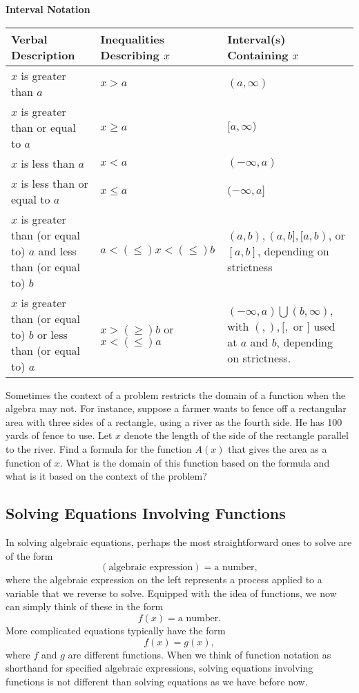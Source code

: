 \begin{tcolorbox}
{\bf Interval Notation}\\
\begin{tabular}{p{2in} | p{1.2in} | p{1in}}
Verbal Description & Inequalities Describing $x$ & Interval(s) Containing $x$\\
\hline\hline $x$ is greater than $a$ & $x>a$ & $(a,\infty)$\\
\hline $x$ is greater than or equal to $a$ & $x\geq a$ & $[a,\infty)$\\
\hline $x$ is less than $a$ & $x<a$ & $(-\infty,a)$\\
\hline $x$ is less than or equal to $a$ & $x\leq a$ & $(-\infty,a]$\\
\hline $x$ is greater than (or equal to) $a$ and less than (or equal to) $b$ & $a<(\leq) x <(\leq) b$ & $(a,b),(a,b],[a,b)$, or $[a,b]$,  depending on strictness\\
\hline $x$ is greater than (or equal to) $b$ or less than (or equal to) $a$ & $x>(\geq) b$ or $x<(\leq) a$ & $(-\infty,a)\bigcup(b,\infty)$, with $(,),[,$ or $]$ used at $a$ and $b$, depending on strictness.  
\end{tabular}

\end{tcolorbox}

\begin{question} Sometimes the context of a problem restricts the domain of a function when the algebra may not. For instance, suppose a farmer wants to fence off a rectangular area with three sides of a rectangle, using a river as the fourth side. He has 100 yards of fence to use. Let $x$ denote the length of the side of the rectangle parallel to the river. Find a formula for the function $A(x)$ that gives the area as a function of $x$. What is the domain of this function based on the formula and what is it based on the context of the problem? 
\end{question}

\subsection{Solving Equations Involving Functions}

In solving algebraic equations, perhaps the most straightforward ones to solve are of the form
\[
(\mbox{algebraic expression}) = \mbox{a number},
\]
where the algebraic expression on the left represents a process applied to a variable that we reverse to solve. Equipped with the idea of functions, we now can simply think of these in the form 
\[
f(x) = \mbox{a number}.
\] 
More complicated equations typically have the form
\[
f(x) = g(x),
\]
where $f$ and $g$ are different functions. When we think of function notation as shorthand for specified algebraic expressions, solving equations involving functions is not different than solving equations as we have before now. 

